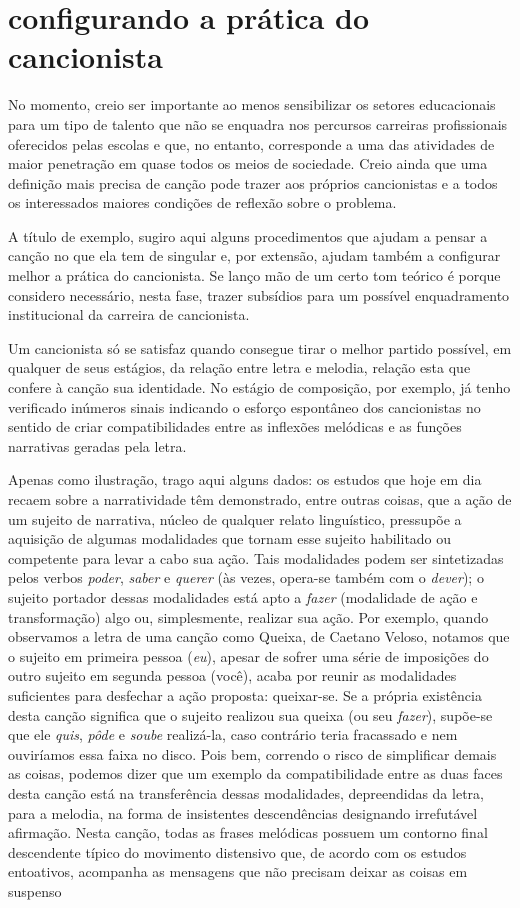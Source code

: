 \section{configurando a prática do cancionista}

No momento, creio ser importante ao menos sensibilizar os setores
educacionais para um tipo de talento que não se enquadra nos percursos
carreiras profissionais oferecidos pelas escolas e que, no entanto,
corresponde a uma das atividades de maior penetração em quase todos os
meios de sociedade. Creio ainda que uma definição mais precisa de canção
pode trazer aos próprios cancionistas e a todos os interessados maiores
condições de reflexão sobre o problema.

A título de exemplo, sugiro aqui alguns procedimentos que ajudam a
pensar a canção no que ela tem de singular e, por extensão, ajudam
também a configurar melhor a prática do cancionista. Se lanço mão de um
certo tom teórico é porque considero necessário, nesta fase, trazer
subsídios para um possível enquadramento institucional da carreira de
cancionista.

Um cancionista só se satisfaz quando consegue tirar o melhor partido
possível, em qualquer de seus estágios, da relação entre letra e
melodia, relação esta que confere à canção sua identidade. No estágio de
composição, por exemplo, já tenho verificado inúmeros sinais indicando o
esforço espontâneo dos cancionistas no sentido de criar
compatibilidades entre as inflexões melódicas e as funções narrativas
geradas pela letra.

Apenas como ilustração, trago aqui alguns dados: os estudos que hoje em
dia recaem sobre a narratividade têm demonstrado, entre outras coisas,
que a ação de um sujeito de narrativa, núcleo de qualquer relato
linguístico, pressupõe a aquisição de algumas modalidades que tornam
esse sujeito habilitado ou competente para levar a cabo sua ação. Tais
modalidades podem ser sintetizadas pelos verbos \textit{poder}, \textit{saber} e
\textit{querer} (às vezes, opera-se também com o \textit{dever}); o sujeito
portador dessas modalidades está apto a \textit{fazer} (modalidade de ação e
transformação) algo ou, simplesmente, realizar sua ação. Por exemplo,
quando observamos a letra de uma canção como Queixa, de Caetano Veloso,
notamos que o sujeito em primeira pessoa (\textit{eu}), apesar de sofrer uma
série de imposições do outro sujeito em segunda pessoa (você), acaba por
reunir as modalidades suficientes para desfechar a ação proposta:
queixar-se. Se a própria existência desta canção significa que o sujeito
realizou sua queixa (ou seu \textit{fazer}), supõe-se que ele \textit{quis},
\textit{pôde} e \textit{soube} realizá-la, caso contrário teria fracassado e nem
ouviríamos essa faixa no disco. Pois bem, correndo o risco de
simplificar demais as coisas, podemos dizer que um exemplo da
compatibilidade entre as duas faces desta canção está na transferência
dessas modalidades, depreendidas da letra, para a melodia, na forma de
insistentes descendências designando irrefutável afirmação. Nesta
canção, todas as frases melódicas possuem um contorno final descendente
típico do movimento distensivo que, de acordo com os estudos entoativos,
acompanha as mensagens que não precisam deixar as coisas em suspenso


